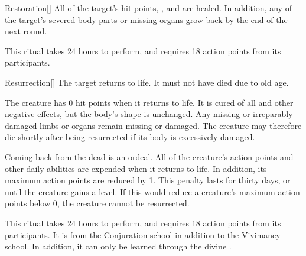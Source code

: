 \lowercase{\hypertarget{spell:Restoration}{}}\label{spell:Restoration}
\begin{apability}[Rank 4]{\hypertarget{spell:Restoration}{Restoration}}[]
All of the target's hit points, , and  are healed.
In addition, any of the target's severed body parts or missing organs grow back by the end of the next round.

This ritual takes 24 hours to perform, and requires 18 action points from its participants.
\end{apability}
\vspace{0.25em}



\lowercase{\hypertarget{spell:Resurrection}{}}\label{spell:Resurrection}
\begin{apability}[Rank 4]{\hypertarget{spell:Resurrection}{Resurrection}}[]
The target returns to life.
It must not have died due to old age.

The creature has 0 hit points when it returns to life.
It is cured of all  and other negative effects, but the body's shape is unchanged.
Any missing or irreparably damaged limbs or organs remain missing or damaged.
The creature may therefore die shortly after being resurrected if its body is excessively damaged.

Coming back from the dead is an ordeal.
All of the creature's action points and other daily abilities are expended when it returns to life.
In addition, its maximum action points are reduced by 1.
This penalty lasts for thirty days, or until the creature gains a level.
If this would reduce a creature's maximum action points below 0, the creature cannot be resurrected.

This ritual takes 24 hours to perform, and requires 18 action points from its participants.
It is from the Conjuration school in addition to the Vivimancy school.
In addition, it can only be learned through the divine .
\end{apability}
\vspace{0.25em}



